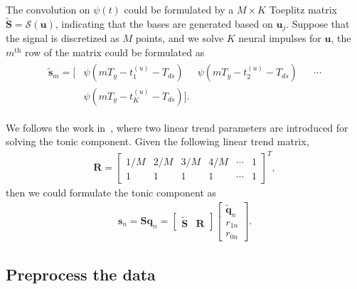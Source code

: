 \documentclass[10pt,conference]{ieeeconf}
\begin{document}
The convolution on $\psi(t)$ could be formulated by a $M \times K$ Toeplitz matrix $\tilde{\mathbf{S}} = \mathcal{S}(\mathbf{u})$, indicating that the bases are generated based on $\mathbf{u}_j$. Suppose that the signal is discretized as $M$ points, and we solve $K$ neural impulses for $\mathbf{u}$, the $m^{\mathrm{th}}$ row of the matrix could be formulated as
\begin{align} \label{fml:tonic-basis-1}
  \begin{aligned}
    \tilde{\mathbf{s}}_m = \big[ &\psi(mT_y - t^{(u)}_1 - T_{ds}) & \psi(mT_y - t^{(u)}_2 - T_{ds}) && \cdots \\
    & \psi(mT_y - t^{(u)}_K - T_{ds}) \big]. &&&
  \end{aligned}
\end{align}

We follows the work in~\cite{greco2015cvxeda}, where two linear trend parameters are introduced for solving the tonic component. Given the following linear trend matrix,
\begin{align} \label{fml:tonic-basis-2}
  \mathbf{R} = \begin{bmatrix}
    1/M & 2/M & 3/M & 4/M & \cdots & 1 \\
    1 & 1 & 1 & 1 & \cdots & 1 
  \end{bmatrix}^T,
\end{align}
then we could formulate the tonic component as
\begin{align}
\mathbf{s}_n = \mathbf{S} \mathbf{q}_n = \begin{bmatrix}
  \tilde{\mathbf{S}} & \mathbf{R}
\end{bmatrix} \begin{bmatrix}
  \tilde{\mathbf{q}}_n \\ r_{1n} \\ r_{0n}
\end{bmatrix}.
\end{align}

\subsection{Preprocess the data}
\end{document}
